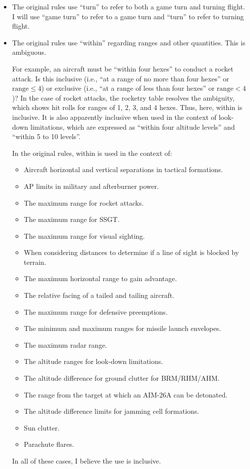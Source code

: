 \documentclass[10pt]{article}
\begin{document}
\begin{itemize}
    \item {} The original rules use “turn” to refer to both a game turn and turning flight. I will use “game turn” to refer to a game turn and “turn” to refer to turning flight.

    \item {} The original rules use “within” regarding ranges and other quantities. This is ambiguous. 
    
    For example, an aircraft must be “within four hexes” to conduct a rocket attack. Is this inclusive (i.e., “at a range of no more than four hexes” or $\textrm{range}\le4$) or exclusive (i.e., “at a range of less than four hexes” or $\textrm{range}<4$)? In the case of rocket attacks, the rocketry table resolves the ambiguity, which shows hit rolls for ranges of 1, 2, 3, and 4 hexes. Thus, here, within is inclusive. It is also apparently inclusive when used in the context of look-down limitations, which are expressed as “within four altitude levels” and “within 5 to 10 levels”.

    In the original rules, within is used in the context of:
    \begin{itemize}
    \item Aircraft horizontal and vertical separations in tactical formations.
    \item AP limits in military and afterburner power.
    \item The maximum range for rocket attacks.
    \item The maximum range for SSGT.
    \item The maximum range for visual sighting.
    \item When considering distances to determine if a line of sight is blocked by terrain.
    \item The maximum horizontal range to gain advantage.
    \item The relative facing of a tailed and tailing aircraft.
    \item The maximum range for defensive preemptions.
    \item The minimum and maximum ranges for missile launch envelopes.
    \item The maximum radar range.
    \item The altitude ranges for look-down limitations.
    \item The altitude difference for ground clutter for BRM/RHM/AHM.
    \item The range from the target at which an AIM-26A can be detonated.
    \item The altitude difference limits for jamming cell formations.
    \item Sun clutter.
    \item Parachute flares.
    \end{itemize}
    In all of these cases, I believe the use is inclusive.

\end{itemize}
\end{document}
